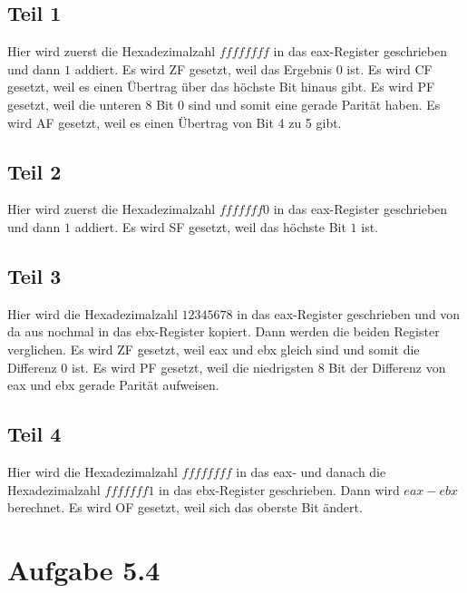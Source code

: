 \documentclass[10pt,a4paper]{article}
\begin{document}
\subsection*{Teil 1}

Hier wird zuerst die Hexadezimalzahl $ffffffff$ in das eax-Register geschrieben und dann $1$ addiert.
Es wird ZF gesetzt, weil das Ergebnis $0$ ist.
Es wird CF gesetzt, weil es einen Übertrag über das höchste Bit hinaus gibt.
Es wird PF gesetzt, weil die unteren 8 Bit $0$ sind und somit eine gerade Parität haben.
Es wird AF gesetzt, weil es einen Übertrag von Bit 4 zu 5 gibt.

\subsection*{Teil 2}

Hier wird zuerst die Hexadezimalzahl $fffffff0$ in das eax-Register geschrieben und dann $1$ addiert.
Es wird SF gesetzt, weil das höchste Bit $1$ ist.

\subsection*{Teil 3}

Hier wird die Hexadezimalzahl $12345678$ in das eax-Register geschrieben und von da aus nochmal in das ebx-Register kopiert.
Dann werden die beiden Register verglichen.
Es wird ZF gesetzt, weil eax und ebx gleich sind und somit die Differenz $0$ ist.
Es wird PF gesetzt, weil die niedrigsten $8$ Bit der Differenz von eax und ebx gerade Parität aufweisen.

\subsection*{Teil 4}

Hier wird die Hexadezimalzahl $ffffffff$ in das eax- und danach die Hexadezimalzahl $fffffff1$ in das ebx-Register geschrieben.
Dann wird $eax - ebx$ berechnet.
Es wird OF gesetzt, weil sich das oberste Bit ändert.

\section*{Aufgabe 5.4}
\end{document}
